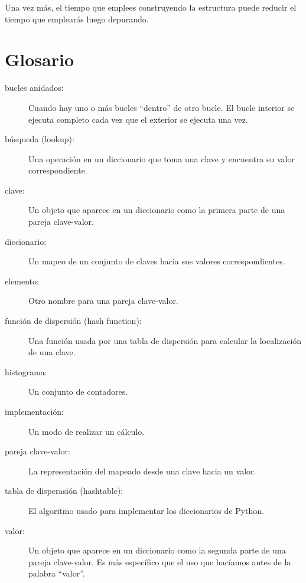 Una vez más, el tiempo que emplees construyendo la estructura puede reducir
el tiempo que emplearás luego depurando.


\section{Glosario}

\begin{description}

\item[bucles anidados:] Cuando hay uno o más bucles ``dentro'' de
otro bucle. El bucle interior se ejecuta completo cada vez que el exterior
se ejecuta una vez.

\item[búsqueda (lookup):] Una operación en un diccionario que toma una clave
y encuentra su valor correspondiente.

\item[clave:] Un objeto que aparece en un diccionario como la
primera parte de una pareja clave-valor.

\item[diccionario:] Un mapeo de un conjunto de claves hacia sus
valores correspondientes.

\item[elemento:] Otro nombre para una pareja clave-valor.

\item[función de dispersión (hash function):] Una función usada por una tabla de dispersión
para calcular la localización de una clave.

\item[histograma:] Un conjunto de contadores.

\item[implementación:] Un modo de realizar un cálculo.

\item[pareja clave-valor:] La representación del mapeado desde
una clave hacia un valor.

\item[tabla de disperasión (hashtable):] El algoritmo usado para implementar
los diccionarios de Python.

\item[valor:] Un objeto que aparece en un diccionario como la
segunda parte de una pareja clave-valor. Es más específico que
el uso que hacíamos antes de la palabra ``valor''.

\end{description}

